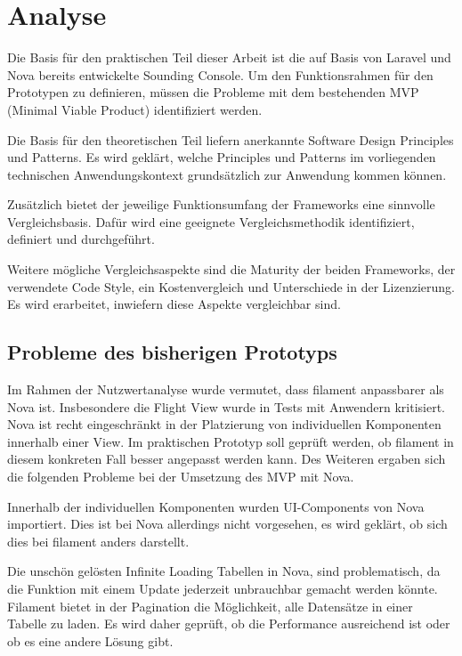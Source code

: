 \section{Analyse}
Die Basis für den praktischen Teil dieser Arbeit ist die auf Basis von Laravel und Nova bereits entwickelte Sounding Console.
Um den Funktionsrahmen für den Prototypen zu definieren, müssen die Probleme mit dem bestehenden MVP (Minimal Viable Product) identifiziert werden.

Die Basis für den theoretischen Teil liefern anerkannte Software Design Principles und Patterns.
Es wird geklärt, welche Principles und Patterns im vorliegenden technischen Anwendungskontext grundsätzlich zur Anwendung kommen können.

Zusätzlich bietet der jeweilige Funktionsumfang der Frameworks eine sinnvolle Vergleichsbasis.
Dafür wird eine geeignete Vergleichsmethodik identifiziert, definiert und durchgeführt.

Weitere mögliche Vergleichsaspekte sind die Maturity der beiden Frameworks, der verwendete Code Style, ein Kostenvergleich und Unterschiede in der Lizenzierung.
Es wird erarbeitet, inwiefern diese Aspekte vergleichbar sind.

\subsection{Probleme des bisherigen Prototyps}
Im Rahmen der Nutzwertanalyse wurde vermutet, dass filament anpassbarer als Nova ist.
Insbesondere die Flight View wurde in Tests mit Anwendern kritisiert.
Nova ist recht eingeschränkt in der Platzierung von individuellen Komponenten innerhalb einer View.
Im praktischen Prototyp soll geprüft werden, ob filament in diesem konkreten Fall besser angepasst werden kann.
Des Weiteren ergaben sich die folgenden Probleme bei der Umsetzung des MVP mit Nova.

Innerhalb der individuellen Komponenten wurden UI-Components von Nova importiert.
Dies ist bei Nova allerdings nicht vorgesehen, es wird geklärt, ob sich dies bei filament anders darstellt.

Die unschön gelösten Infinite Loading Tabellen in Nova, sind problematisch, da die Funktion mit einem Update jederzeit unbrauchbar gemacht werden könnte.
Filament bietet in der Pagination die Möglichkeit, alle Datensätze in einer Tabelle zu laden.
Es wird daher geprüft, ob die Performance ausreichend ist oder ob es eine andere Lösung gibt.

